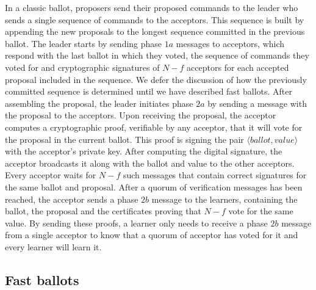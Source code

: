 In a classic ballot, proposers send their proposed commands to the leader who sends a single sequence of commands to the acceptors. This sequence is built by appending the new proposals to the longest sequence committed in the previous ballot. The leader starts by sending phase $1a$ messages to acceptors, which respond with the last ballot in which they voted, the sequence of commands they voted for and cryptographic signatures of $N-f$ acceptors for each accepted proposal included in the sequence. We defer the discussion of how the previously committed sequence is determined until we have described fast ballots. After assembling the proposal, the leader initiates phase $2a$ by sending a message with the proposal to the acceptors. Upon receiving the proposal, the acceptor computes a cryptographic proof, verifiable by any acceptor, that it will vote for the proposal in the current ballot. This proof is signing the pair $\langle ballot,value \rangle$ with the acceptor's private key. After computing the digital signature, the acceptor broadcasts it along with the ballot and value to the other acceptors. Every acceptor waits for $N-f$ such messages that contain correct signatures for the same ballot and proposal. After a quorum of verification messages has been reached, the acceptor sends a phase $2b$ message to the learners, containing the ballot, the proposal and the certificates proving that $N-f$ vote for the same value. By sending these proofs, a learner only needs to receive a phase $2b$ message from a single acceptor to know that a quorum of acceptor has voted for it and every learner will learn it. \par

\subsection{Fast ballots} 

